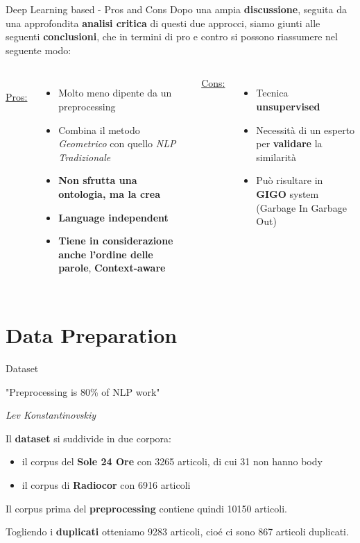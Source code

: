 \documentclass[british]{beamer}
\begin{document}
\begin{frame}{Deep Learning based - Pros and Cons}
	Dopo una ampia \textbf{discussione}, seguita da una approfondita \textbf{analisi critica} di questi due approcci, siamo giunti alle seguenti \textbf{conclusioni}, che in termini di pro e contro si possono riassumere nel seguente modo:
	\begin{columns}
		\\
		\underline{Pros:}
		\begin{itemize}
			\item Molto meno dipente da un preprocessing
			\item Combina il metodo \textit{Geometrico} con quello \textit{NLP Tradizionale}
			\item \textbf{Non sfrutta una ontologia, ma la \alert{crea}} 
			\item \textbf{\alert{Language independent}}
			\item \textbf{\alert{Tiene in considerazione anche l'ordine delle parole}}, \textbf{Context-aware}
		\end{itemize}
		\underline{Cons:}
		\begin{itemize}
			\item Tecnica \textbf{unsupervised}
			\item Necessit\`{a} di un esperto per \textbf{validare} la similarit\`{a}
			\item Pu\`{o} risultare in \textbf{GIGO} system (Garbage In Garbage Out)
		\end{itemize}
	\end{columns}
\end{frame}
	
\section{Data Preparation}

\begin{frame}{Dataset}
	\begin{displayquote}
		"Preprocessing is 80\% of NLP work"
		 
		\begin{flushright}
			\textit{Lev Konstantinovskiy}
		\end{flushright}
	\end{displayquote}
	Il \textbf{dataset} si suddivide in due corpora: 
	\begin{itemize}
		\item il corpus del \textbf{Sole 24 Ore} con 3265 articoli, di cui 31 non hanno body
		\item il corpus di \textbf{Radiocor} con 6916 articoli
	\end{itemize}
	Il corpus prima del \textbf{preprocessing} contiene quindi 10150 articoli. \par
	Togliendo i \textbf{duplicati} otteniamo 9283 articoli, cio\'{e} ci sono 867 articoli duplicati.
\end{frame}
\end{document}
